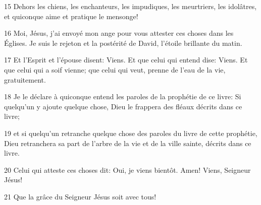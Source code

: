 \par 15 Dehors les chiens, les enchanteurs, les impudiques, les meurtriers, les idolâtres, et quiconque aime et pratique le mensonge!
\par 16 Moi, Jésus, j'ai envoyé mon ange pour vous attester ces choses dans les Églises. Je suis le rejeton et la postérité de David, l'étoile brillante du matin.
\par 17 Et l'Esprit et l'épouse disent: Viens. Et que celui qui entend dise: Viens. Et que celui qui a soif vienne; que celui qui veut, prenne de l'eau de la vie, gratuitement.
\par 18 Je le déclare à quiconque entend les paroles de la prophétie de ce livre: Si quelqu'un y ajoute quelque chose, Dieu le frappera des fléaux décrits dans ce livre;
\par 19 et si quelqu'un retranche quelque chose des paroles du livre de cette prophétie, Dieu retranchera sa part de l'arbre de la vie et de la ville sainte, décrits dans ce livre.
\par 20 Celui qui atteste ces choses dit: Oui, je viens bientôt. Amen! Viens, Seigneur Jésus!
\par 21 Que la grâce du Seigneur Jésus soit avec tous!


